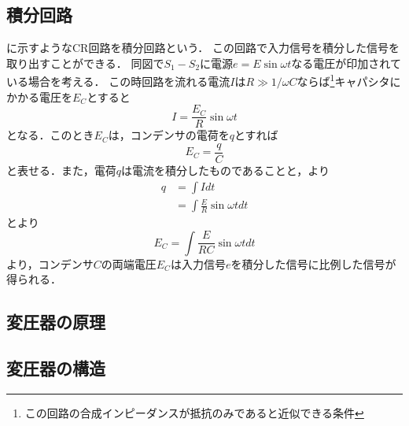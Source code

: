 \subsection{積分回路}
に示すようなCR回路を積分回路という．
この回路で入力信号を積分した信号を取り出すことができる．
同図で$S_{1}-S_{2}$に電源$e=E\sin \omega t$なる電圧が印加されている場合を考える．
この時回路を流れる電流$I$は$R\gg 1/\omega C$ならば\footnote{この回路の合成インピーダンスが抵抗のみであると近似できる条件}キャパシタにかかる電圧を$E_{C}$とすると
\begin{equation}
	I=\frac{E_{C}}{R}\sin \omega t
	\label{eq:I}
\end{equation}
となる．このとき$E_{C}$は，コンデンサの電荷を$q$とすれば
\begin{equation}
	E_{C}=\frac{q}{C}
	\label{eq:qcv}
\end{equation}
と表せる．また，電荷$q$は電流を積分したものであることと，より
\begin{align}
	q&=\int I dt\nonumber \\
	&=\int \frac{E}{R}\sin \omega tdt
	\label{eq:int}
\end{align}
とより
\begin{equation}
	E_{C}=\int \frac{E}{RC} \sin \omega tdt
	\label{eq:sekibun}
\end{equation}
より，コンデンサ$C$の両端電圧$E_{C}$は入力信号$e$を積分した信号に比例した信号が得られる．

\subsection{変圧器の原理\cite{jknv}}

\subsection{変圧器の構造}
